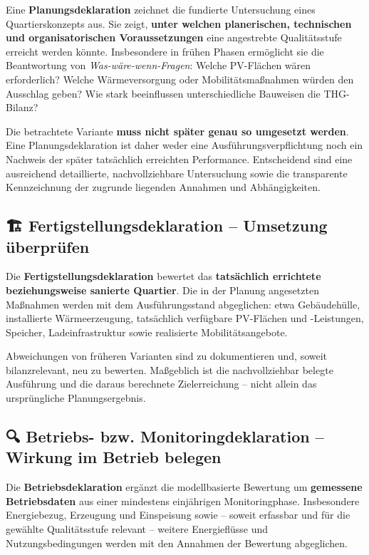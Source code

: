 \documentclass[
  ngerman,
  a4paper,
  DIV=11]{scrreprt}
\begin{document}
Eine \textbf{Planungsdeklaration} zeichnet die fundierte Untersuchung
eines Quartierskonzepts aus. Sie zeigt, \textbf{unter welchen
planerischen, technischen und organisatorischen Voraussetzungen} eine
angestrebte Qualitätsstufe erreicht werden könnte. Insbesondere in
frühen Phasen ermöglicht sie die Beantwortung von
\emph{Was-wäre-wenn-Fragen}: Welche PV-Flächen wären erforderlich?
Welche Wärmeversorgung oder Mobilitätsmaßnahmen würden den Ausschlag
geben? Wie stark beeinflussen unterschiedliche Bauweisen die THG-Bilanz?

Die betrachtete Variante \textbf{muss nicht später genau so umgesetzt
werden}. Eine Planungsdeklaration ist daher weder eine
Ausführungsverpflichtung noch ein Nachweis der später tatsächlich
erreichten Performance. Entscheidend sind eine ausreichend detaillierte,
nachvollziehbare Untersuchung sowie die transparente Kennzeichnung der
zugrunde liegenden Annahmen und Abhängigkeiten.

\subsection{🏗️ Fertigstellungsdeklaration -- Umsetzung
überprüfen}\label{fertigstellungsdeklaration-umsetzung-uxfcberpruxfcfen}

Die \textbf{Fertigstellungsdeklaration} bewertet das \textbf{tatsächlich
errichtete beziehungsweise sanierte Quartier}. Die in der Planung
angesetzten Maßnahmen werden mit dem Ausführungsstand abgeglichen: etwa
Gebäudehülle, installierte Wärmeerzeugung, tatsächlich verfügbare
PV-Flächen und -Leistungen, Speicher, Ladeinfrastruktur sowie
realisierte Mobilitätsangebote.

Abweichungen von früheren Varianten sind zu dokumentieren und, soweit
bilanzrelevant, neu zu bewerten. Maßgeblich ist die nachvollziehbar
belegte Ausführung und die daraus berechnete Zielerreichung -- nicht
allein das ursprüngliche Planungsergebnis.

\subsection{🔍 Betriebs- bzw. Monitoringdeklaration -- Wirkung im
Betrieb
belegen}\label{betriebs--bzw.-monitoringdeklaration-wirkung-im-betrieb-belegen}

Die \textbf{Betriebsdeklaration} ergänzt die modellbasierte Bewertung um
\textbf{gemessene Betriebsdaten} aus einer mindestens einjährigen
Monitoringphase. Insbesondere Energiebezug, Erzeugung und Einspeisung
sowie -- soweit erfassbar und für die gewählte Qualitätsstufe relevant
-- weitere Energieflüsse und Nutzungsbedingungen werden mit den Annahmen
der Bewertung abgeglichen.
\end{document}
